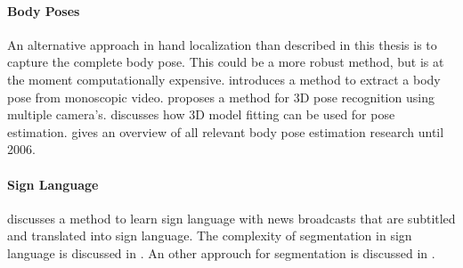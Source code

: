 \paragraph{Body Poses}
 An alternative approach in hand localization than described in this thesis is to capture the complete body pose. This could be a more robust method, but is at the moment computationally expensive. \cite{ferrari2008} introduces a method to extract a body pose from monoscopic video. \cite{VandenBergh2009} proposes a method for 3D pose recognition using multiple camera's. \cite{Poppe2007} discusses how 3D model fitting can be used for pose estimation. \cite{Moeslund2006} gives an overview of all relevant body pose estimation research until 2006.


\paragraph{Sign Language}
\cite{Buehler2009} discusses a method to learn sign language with news broadcasts that are subtitled and translated into sign language. The complexity of segmentation in sign language is discussed in \cite{RichardBowden2004}. An other approuch for segmentation is discussed in \cite{Cooper2007}.





